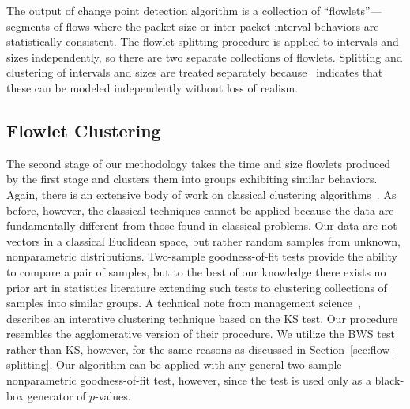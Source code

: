 \documentclass[conference]{IEEEtran}
\newcommand{\caps}[1]{{\small{#1}}}
\begin{document}
%
The output of change point detection algorithm is a collection of ``flowlets''---segments of flows where the packet size or inter-packet interval behaviors are statistically consistent. %
The flowlet splitting procedure is applied to intervals and sizes independently, so there are two separate collections of flowlets. Splitting and clustering of intervals and sizes are treated separately because~\cite{Karpinski07:realism} indicates that these can be modeled independently without loss of realism.

\subsection{Flowlet Clustering}
\label{sec:flowlet-clustering}

The second stage of our methodology takes the time and size flowlets produced by the first stage and clusters them into groups exhibiting similar behaviors. Again, there is an extensive body of work on classical clustering algorithms~\cite{Jain99}. As before, however, the classical techniques cannot be applied because the data are fundamentally different from those found in classical problems. Our data are not vectors in a classical Euclidean space, but rather random samples from unknown, nonparametric distributions. Two-sample goodness-of-fit tests provide the ability to compare a pair of samples, but to the best of our knowledge there exists no prior art in statistics literature extending such tests to clustering collections of samples into similar groups. A technical note from management science~\cite{Ruefli00}, describes an interative clustering technique based on the \caps{KS} test. Our procedure resembles the agglomerative version of their procedure. We utilize the \caps{BWS} test rather than \caps{KS}, however, for the same reasons as discussed in Section~\ref{sec:flow-splitting}. Our algorithm can be applied with any general two-sample nonparametric goodness-of-fit test, however, since the test is used only as a black-box generator of $p$-values.
\end{document}
